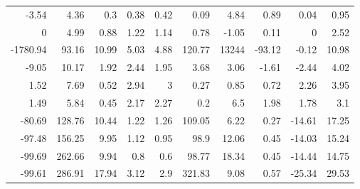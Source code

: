 \begin{tabular}{rrrrrrrrrr}
      -3.54 &    4.36 &    0.3  &     0.38 &   0.42 &      0.09        &              4.84 &              0.89 &           0.04 &            0.95 \\
       0    &    4.99 &    0.88 &     1.22 &   1.14 &      0.78        &             -1.05 &              0.11 &           0    &            2.52 \\
   -1780.94 &   93.16 &   10.99 &     5.03 &   4.88 &    120.77        &          13244    &            -93.12 &          -0.12 &           10.98 \\
      -9.05 &   10.17 &    1.92 &     2.44 &   1.95 &      3.68        &              3.06 &             -1.61 &          -2.44 &            4.02 \\
       1.52 &    7.69 &    0.52 &     2.94 &   3    &      0.27        &              0.85 &              0.72 &           2.26 &            3.95 \\
       1.49 &    5.84 &    0.45 &     2.17 &   2.27 &      0.2         &              6.5  &              1.98 &           1.78 &            3.1  \\
     -80.69 &  128.76 &   10.44 &     1.22 &   1.26 &    109.05        &              6.22 &              0.27 &         -14.61 &           17.25 \\
     -97.48 &  156.25 &    9.95 &     1.12 &   0.95 &     98.9         &             12.06 &              0.45 &         -14.03 &           15.24 \\
     -99.69 &  262.66 &    9.94 &     0.8  &   0.6  &     98.77        &             18.34 &              0.45 &         -14.44 &           14.75 \\
     -99.61 &  286.91 &   17.94 &     3.12 &   2.9  &    321.83        &              9.08 &              0.57 &         -25.34 &           29.53 \\
\hline
\end{tabular}